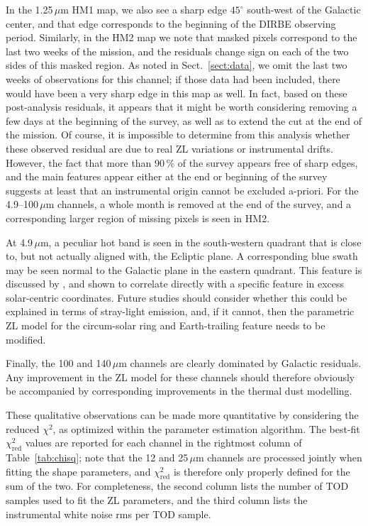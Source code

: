 \documentclass[twocolumn]{aa}
\begin{document}
In the 1.25\,$\mu$m HM1 map, we also see a sharp edge $45^{\circ}$
south-west of the Galactic center, and that edge corresponds to the
beginning of the DIRBE observing period. Similarly, in the HM2 map we
note that masked pixels correspond to the last two weeks of the
mission, and the residuals change sign on each of the two sides of
this masked region. As noted in Sect.~\ref{sect:data}, we omit the
last two weeks of observations for this channel; if those data had
been included, there would have been a very sharp edge in this map as
well. In fact, based on these post-analysis residuals, it appears that
it might be worth considering removing a few days at the beginning of
the survey, as well as to extend the cut at the end of the mission. Of
course, it is impossible to determine from this analysis whether these
observed residual are due to real ZL variations or instrumental
drifts. However, the fact that more than 90\,\% of the survey appears
free of sharp edges, and the main features appear either at the end or
beginning of the survey suggests at least that an instrumental origin
cannot be excluded a-priori. For the 4.9--100$\,\mu$m channels, a
whole month is removed at the end of the survey, and a corresponding
larger region of missing pixels is seen in HM2.


At 4.9\,$\mu$m, a peculiar hot band is seen in the south-western
quadrant that is close to, but not actually aligned with, the Ecliptic
plane. A corresponding blue swath may be seen normal to the Galactic
plane in the eastern quadrant. This feature is discussed by
\citet{CG02_01}, and shown to correlate directly with a specific
feature in excess solar-centric coordinates. Future studies should
consider whether this could be explained in terms of stray-light
emission, and, if it cannot, then the parametric ZL model for the
circum-solar ring and Earth-trailing feature needs to be modified.

Finally, the 100 and 140$\,\mu$m channels are clearly dominated by
Galactic residuals. Any improvement in the ZL model for these
channels should therefore obviously be accompanied by corresponding
improvements in the thermal dust modelling.


These qualitative observations can be made more quantitative by
considering the reduced $\chi^2$, as optimized within the parameter
estimation algorithm. The best-fit $\chi^2_{\mathrm{red}}$ values are
reported for each channel in the rightmost column of
Table~\ref{tab:chisq}; note that the 12 and 25$\,\mu$m channels are
processed jointly when fitting the shape parameters, and
$\chi^2_{\mathrm{red}}$ is therefore only properly defined for the sum
of the two. For completeness, the second column lists the number of
TOD samples used to fit the ZL parameters, and the third column lists
the instrumental white noise rms per TOD sample.
\end{document}
